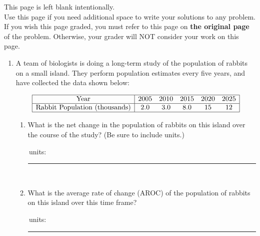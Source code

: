 \documentclass[11pt]{article}
\begin{document}
\vfill


\newpage

This page is left blank intentionally.\\

Use this page if you need additional space to write your solutions to any problem. \\

If you wish this page graded, you must refer to this page on \textbf{the original page} of the problem. Otherwise, your grader will NOT consider your work on this page.

\newpage%


\begin{enumerate}


\item A team of biologists is doing a long-term study of the population of rabbits on a small island. They perform population estimates every five years, and have collected the data shown below:

\[
    \begin{array}{|c|ccccc|}
        \hline\text{Year} & 2005 & 2010 & 2015 & 2020 & 2025\\\hline
        \text{Rabbit Population (thousands)} & 2.0 & 3.0 & 8.0 & 15 & 12\\\hline
    \end{array}
\]

\bigskip

\begin{enumerate}
    \item What is the net change in the population of rabbits on this island over the course of the study? (Be sure to include units.)

    \vspace{3cm}

        \,\hfill units: \rule{1.75in}{0.4pt}\\

    \item What is the average rate of change (AROC) of the population of rabbits on this island over this time frame?

    \vspace{3cm}

        \,\hfill units: \rule{1.75in}{0.4pt}\\


\end{enumerate}
\end{enumerate}
\end{document}
